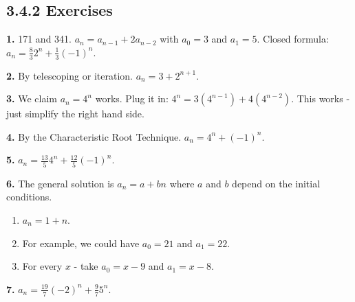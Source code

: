 \documentclass[10pt,]{book}
\theoremstyle{plain}
\theoremstyle{definition}
\theoremstyle{definition}
\theoremstyle{definition}
\numberwithin{equation}{chapter}
\begin{document}
\subsection*{3.4.2 Exercises}
\noindent\textbf{1.}\quad{}
171 and 341. \(a_n = a_{n-1} + 2a_{n-2}\) with \(a_0 = 3\) and \(a_1 = 5\). Closed formula: \(a_n = \frac{8}{3}2^n + \frac{1}{3}(-1)^n\).
%
\par\smallskip
\noindent\textbf{2.}\quad{}
By telescoping or iteration. \(a_n = 3 + 2^{n+1}\).
%
\par\smallskip
\noindent\textbf{3.}\quad{}
We claim \(a_n = 4^n\) works. Plug it in: \(4^n = 3(4^{n-1}) + 4(4^{n-2})\). This works - just simplify the right hand side.
%
\par\smallskip
\noindent\textbf{4.}\quad{}
By the Characteristic Root Technique. \(a_n = 4^n + (-1)^n\).
%
\par\smallskip
\noindent\textbf{5.}\quad{}
\(a_n = \frac{13}{5} 4^n + \frac{12}{5} (-1)^n\).
%
\par\smallskip
\noindent\textbf{6.}\quad{}
The general solution is \(a_n = a + bn\) where \(a\) and \(b\) depend on the initial conditions.
%
\leavevmode%
\begin{enumerate}[label=(\alph*)]
\item\hypertarget{li-939}{}\(a_n = 1 + n\).%
\item\hypertarget{li-940}{}
For example, we could have \(a_0 = 21\) and \(a_1 = 22\).
%
\item\hypertarget{li-941}{}
For every \(x\) - take \(a_0 = x-9\) and \(a_1 = x-8\).
%
\end{enumerate}
\par\smallskip
\noindent\textbf{7.}\quad{}
\(a_n = \frac{19}{7}(-2)^n + \frac{9}{7}5^n\).
%
\par\smallskip
\end{document}
